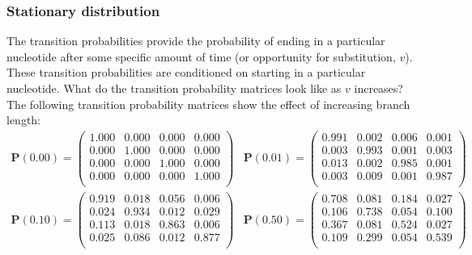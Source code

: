 \documentclass{svmult}
\begin{document}
\subsubsection{Stationary distribution} The transition probabilities provide the probability of ending in a particular nucleotide after
some specific amount of time (or opportunity for substitution, $v$). These transition probabilities are conditioned
on starting in a particular nucleotide. What do the transition probability matrices look like as $v$ increases? The following
transition probability matrices show the effect of increasing branch length:
$$
\begin{array}{cc}
{{\mathbf P}(0.00) = \left( \begin{array}{rrrr}
1.000 & 0.000 & 0.000 & 0.000 \\
0.000 & 1.000 & 0.000 & 0.000 \\
0.000 & 0.000 & 1.000 & 0.000 \\
0.000 & 0.000 & 0.000 & 1.000 \\
\end{array} \right)}
 &
{{\mathbf P}(0.01) = \left( \begin{array}{rrrr}
0.991 & 0.002 & 0.006 & 0.001 \\
0.003 & 0.993 & 0.001 & 0.003 \\
0.013 & 0.002 & 0.985 & 0.001 \\
0.003 & 0.009 & 0.001 & 0.987 \\
\end{array} \right)}
\end{array}
$$
$$
\begin{array}{cc}
{{\mathbf P}(0.10) = \left( \begin{array}{rrrr}
0.919 & 0.018 & 0.056 & 0.006 \\
0.024 & 0.934 & 0.012 & 0.029 \\
0.113 & 0.018 & 0.863 & 0.006 \\
0.025 & 0.086 & 0.012 & 0.877 \\
\end{array} \right)}
 &
{{\mathbf P}(0.50) = \left( \begin{array}{rrrr}
0.708 & 0.081 & 0.184 & 0.027 \\
0.106 & 0.738 & 0.054 & 0.100 \\
0.367 & 0.081 & 0.524 & 0.027 \\
0.109 & 0.299 & 0.054 & 0.539 \\
\end{array} \right)}
\end{array}
$$
\end{document}
